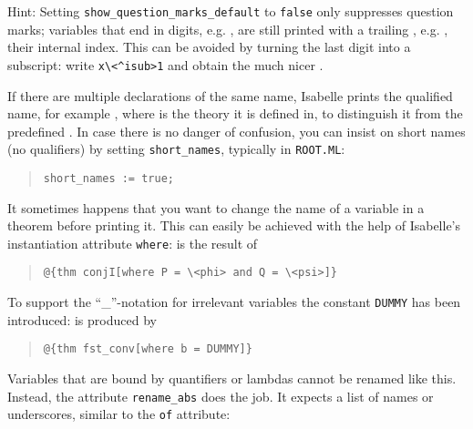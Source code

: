 \begin{isabellebody}
\begin{isamarkuptext}
Hint: Setting \verb!show_question_marks_default! to \texttt{false} only
suppresses question marks; variables that end in digits,
e.g. , are still printed with a trailing ,
e.g. , their internal index. This can be avoided by
turning the last digit into a subscript: write \verb!x\<^isub>1! and
obtain the much nicer .%
\end{isamarkuptext}%
\isamarkuptrue%
%
\isamarkuptrue%
%
\begin{isamarkuptext}%
If there are multiple declarations of the same name, Isabelle prints
the qualified name, for example , where  is the
theory it is defined in, to distinguish it from the predefined . In case there is no danger of confusion, you can insist on
short names (no qualifiers) by setting \verb!short_names!, typically
in \texttt{ROOT.ML}:
\begin{quote}
\verb|short_names := true|\verb!;!
\end{quote}%
\end{isamarkuptext}%
\isamarkuptrue%
%
\isamarkuptrue%
%
\begin{isamarkuptext}%
It sometimes happens that you want to change the name of a
variable in a theorem before printing it. This can easily be achieved
with the help of Isabelle's instantiation attribute \texttt{where}:
\isa{{\isasymlbrakk}{\isasymphi}{\isacharsemicolon}\ {\isasympsi}{\isasymrbrakk}\ {\isasymLongrightarrow}\ {\isasymphi}\ {\isasymand}\ {\isasympsi}} is the result of
\begin{quote}
\verb!@!\verb!{thm conjI[where P = \<phi> and Q = \<psi>]}!
\end{quote}
To support the ``\_''-notation for irrelevant variables
the constant \texttt{DUMMY} has been introduced:
 is produced by
\begin{quote}
\verb!@!\verb!{thm fst_conv[where b = DUMMY]}!
\end{quote}
Variables that are bound by quantifiers or lambdas cannot be renamed
like this. Instead, the attribute \texttt{rename\_abs} does the
job. It expects a list of names or underscores, similar to the
\texttt{of} attribute:
\begin{quote}

\end{quote}
\end{isamarkuptext}
\end{isabellebody}
